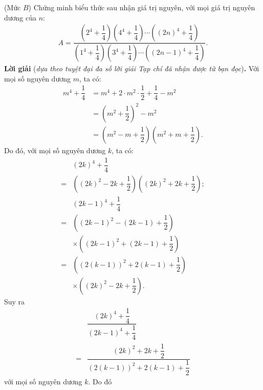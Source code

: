 \begin{multicols}{2}
	{}
	(Mức $B$) Chứng minh biểu thức sau nhận giá trị nguyên, với mọi giá trị nguyên dương của $n$:
	\begin{align*}
		A\!=\!\dfrac{\left(2^4\!+\!\dfrac14\right)\!\left(4^4\!+\!\dfrac14\right)\!\cdots\! \left((2n)^4\!+\!\dfrac14\right)}{\left(1^4\!+\!\dfrac14\right)\left(3^4\!+\!\dfrac14\right)\!\cdots\! \left((2n\!-\!1)^4\!+\!\dfrac14\right)}.
	\end{align*}
	\textbf{\color{thachthuctoanhoc}Lời giải} (\textit{dựa theo tuyệt đại đa số lời giải Tạp chí đã nhận được từ bạn đọc})\textbf{\color{thachthuctoanhoc}.}
	\vskip 0.05cm
	Với mọi số nguyên dương $m$, ta có:
	\begin{align*}
		{m^4} + \dfrac{1}{4} &= {m^4} + 2 \cdot {m^2} \cdot \dfrac{1}{2} + \dfrac{1}{4} - {m^2}\\
		& = {\left( {{m^2} + \dfrac{1}{2}} \right)^2} - {m^2}\\
		 &= \left( {{m^2} - m + \dfrac{1}{2}} \right)\left( {{m^2} + m + \dfrac{1}{2}} \right).
	\end{align*}
	Do đó, với mọi số nguyên dương $k$, ta có:
	\begin{align*}
		&{\left( {2k} \right)^4} + \dfrac{1}{4} \\
		= &\left( {{{\left( {2k} \right)}^2} - 2k + \dfrac{1}{2}} \right)\left( {{{\left( {2k} \right)}^2} + 2k + \dfrac{1}{2}} \right);\\
			&{\left( {2k - 1} \right)^4} + \dfrac{1}{4} \\
			= &\left(\left( {2k - 1} \right)^2 - \left( {2k - 1} \right) + \dfrac{1}{2}\right)\\
			&\times\left( \left( {2k - 1} \right)^2 + \left( {2k - 1} \right) + \dfrac{1}{2} \right)\\
			 = &\left( \left( 2\left( {k - 1} \right) \right)^2 + 2\left(k - 1 \right) + \dfrac{1}{2}\right)\\
			 &\times\left(\left( {2k} \right)^2 - 2k + \dfrac{1}{2}\right).
	\end{align*}
	Suy ra
	\begin{align*}
		&\dfrac{{{{\left( {2k} \right)}^4} + \dfrac{1}{4}}}{{{{\left( {2k - 1} \right)}^4} + \dfrac{1}{4}}} \\[-0.5ex]
		= &\dfrac{{{{\left( {2k} \right)}^2} + 2k + \dfrac{1}{2}}}{{{{\left( {2\left( {k - 1} \right)} \right)}^2} + 2\left( {k - 1} \right) + \dfrac{1}{2}}}
	\end{align*}
	với mọi số nguyên dương $k$.
	\vskip 0.05cm
	Do đó
	\begin{align*}

\end{align*}
\end{multicols}
